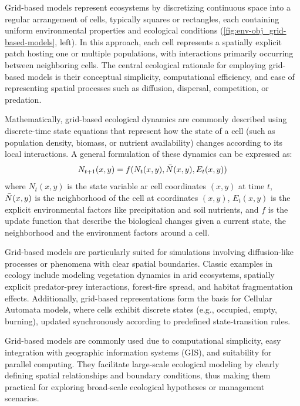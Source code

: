 Grid-based models represent ecosystems by discretizing continuous space into a regular arrangement of cells, typically squares or rectangles, each containing uniform environmental properties and ecological conditions (\cref{fig:env-obj_grid-based-models}, left). In this approach, each cell represents a spatially explicit patch hosting one or multiple populations, with interactions primarily occurring between neighboring cells. The central ecological rationale for employing grid-based models is their conceptual simplicity, computational efficiency, and ease of representing spatial processes such as diffusion, dispersal, competition, or predation.

Mathematically, grid-based ecological dynamics are commonly described using discrete-time state equations that represent how the state of a cell (such as population density, biomass, or nutrient availability) changes according to its local interactions. A general formulation of these dynamics can be expressed as:
\begin{align}
    N_{t+1}(x,y) = f(N_t(x,y), \Bar{N}(x, y), E_t(x, y))
\end{align}
where $N_t(x, y)$ is the state variable ar cell coordinates $(x, y)$ at time $t$, $\Bar{N}(x, y)$ is the neighborhood of the cell at coordinates $(x, y)$, $E_t(x, y)$ is the explicit environmental factors like precipitation and soil nutrients, and $f$ is the update function that describe the biological changes given a current state, the neighborhood and the environment factors around a cell.

Grid-based models are particularly suited for simulations involving diffusion-like processes or phenomena with clear spatial boundaries. Classic examples in ecology include modeling vegetation dynamics in arid ecosystems, spatially explicit predator-prey interactions, forest-fire spread, and habitat fragmentation effects. Additionally, grid-based representations form the basis for Cellular Automata models, where cells exhibit discrete states (e.g., occupied, empty, burning), updated synchronously according to predefined state-transition rules.

Grid-based models are commonly used due to computational simplicity, easy integration with geographic information systems (GIS), and suitability for parallel computing. They facilitate large-scale ecological modeling by clearly defining spatial relationships and boundary conditions, thus making them practical for exploring broad-scale ecological hypotheses or management scenarios.

